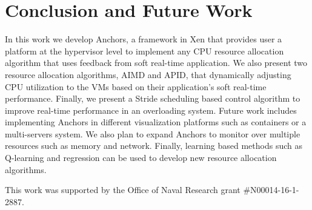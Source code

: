 \section{Conclusion and Future Work}
\label{s5}
\cite{lc2} 

In this work we develop Anchors, a framework in Xen that provides user a platform at the hypervisor level to implement any CPU resource allocation algorithm that uses feedback from soft real-time application. We also present two resource allocation algorithms, AIMD and APID, that dynamically adjusting CPU utilization to the VMs based on their application's soft real-time performance. Finally, we present a Stride scheduling based control algorithm to improve real-time performance in an overloading system. Future work includes implementing Anchors in different visualization platforms such as containers or a multi-servers system. We also plan to expand Anchors to monitor over multiple resources such as memory and network. Finally, learning based  methods such as Q-learning and regression can be used to develop new resource allocation algorithms. 

This work was supported by the Office of Naval Research grant \#N00014-16-1-2887.



